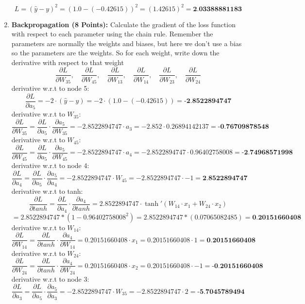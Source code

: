 \documentclass{article}
\begin{document}
\begin{enumerate}
    \[
    L = (\hat{y} - y)^2 = (1.0 - (-0.42615))^2 = (1.42615)^2 = \textbf{2.03388881183}
    \]
    \item \textbf{Backpropagation (8 Points):} Calculate the gradient of the loss function with respect to each parameter
using the chain rule. Remember the parameters are normally the weights and biases, but here we
don’t use a bias so the parameters are the weights. So for each weight, write down the derivative with
respect to that weight
    \[ 
        \frac{\partial L}{\partial W_{35}}, \quad \frac{\partial L}{\partial W_{45}}, \quad \frac{\partial L}{\partial W_{13}}, \quad \frac{\partial L}{\partial W_{14}}, \quad \frac{\partial L}{\partial W_{23}}, \quad \frac{\partial L}{\partial W_{24}} 
    \]
    derivative w.r.t to node 5:
    \[
    \frac{\partial L}{\partial a_5} = -2 \cdot (\hat{y} - y) = -2 \cdot (1.0 - (-0.42615)) = \textbf{-2.8522894747}
    \]
    derivative w.r.t to $W_{35}$:
    \[
    \frac{\partial L}{\partial W_{35}} = \frac{\partial L}{\partial a_5} \cdot \frac{\partial a_5}{\partial W_{35}} = -2.8522894747 \cdot a_3 = -2.852 \cdot 0.26894142137 = \textbf{-0.76709878548}
    \]
    derivative w.r.t to $W_{45}$:
    \[
    \frac{\partial L}{\partial W_{45}} = \frac{\partial L}{\partial a_5} \cdot \frac{\partial a_5}{\partial W_{45}} = -2.8522894747 \cdot a_4 = -2.8522894747 \cdot 0.96402758008 = \textbf{-2.74968571998}
    \]
    derivative w.r.t to node 4:
    \[
    \frac{\partial L}{\partial a_4} = \frac{\partial L}{\partial a_5} \cdot \frac{\partial a_5}{\partial a_4} = -2.8522894747 \cdot W_{45} = -2.8522894747 \cdot -1 = \textbf{2.8522894747}
    \]
    derivative w.r.t to tanh:
    \[
    \frac{\partial L}{\partial tanh} = \frac{\partial L}{\partial a_4} \cdot \frac{\partial a_4}{\partial tanh} = 2.8522894747 \cdot \tanh'(W_{14} \cdot x_1 + W_{24} \cdot x_2) 
    \]
    \[
    = 2.8522894747 * (1- 0.96402758008^2) = 2.8522894747 * (0.07065082485 ) = \textbf{0.20151660408}
    \]
    derivative w.r.t to $W_{14}$:
    \[
    \frac{\partial L}{\partial W_{14}} = \frac{\partial L}{\partial tanh} \cdot \frac{\partial a_4}{\partial W_{14}} = 0.20151660408 \cdot x_1 = 0.20151660408 \cdot 1 = \textbf{0.20151660408}
    \]
    derivative w.r.t to $W_{24}$:
    \[
    \frac{\partial L}{\partial W_{24}} = \frac{\partial L}{\partial tanh} \cdot \frac{\partial a_4}{\partial W_{24}} = 0.20151660408 \cdot x_2 = 0.20151660408 \cdot -1 = \textbf{-0.20151660408}
    \]
    derivative w.r.t to node 3:
    \[
    \frac{\partial L}{\partial a_3} = \frac{\partial L}{\partial a_5} \cdot \frac{\partial a_5}{\partial a_3} = -2.8522894747 \cdot W_{35} = -2.8522894747 \cdot 2 = \textbf{-5.7045789494}
\]
\end{enumerate}
\end{document}
